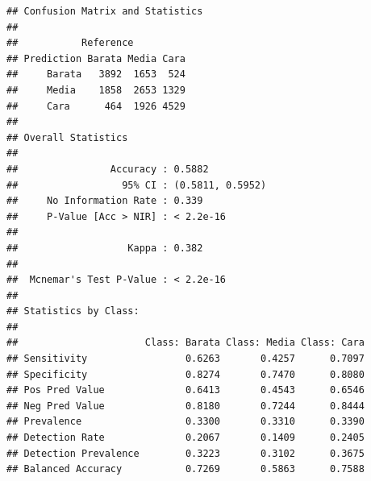 \documentclass[
]{article}
\newenvironment{Shaded}{\begin{snugshade}}{\end{snugshade}}
\newcommand{\AttributeTok}[1]{\textcolor[rgb]{0.13,0.29,0.53}{#1}}
\newcommand{\ConstantTok}[1]{\textcolor[rgb]{0.56,0.35,0.01}{#1}}
\newcommand{\DecValTok}[1]{\textcolor[rgb]{0.00,0.00,0.81}{#1}}
\newcommand{\FloatTok}[1]{\textcolor[rgb]{0.00,0.00,0.81}{#1}}
\newcommand{\FunctionTok}[1]{\textcolor[rgb]{0.13,0.29,0.53}{\textbf{#1}}}
\newcommand{\NormalTok}[1]{#1}
\newcommand{\OtherTok}[1]{\textcolor[rgb]{0.56,0.35,0.01}{#1}}
\newcommand{\SpecialCharTok}[1]{\textcolor[rgb]{0.81,0.36,0.00}{\textbf{#1}}}
\newcommand{\StringTok}[1]{\textcolor[rgb]{0.31,0.60,0.02}{#1}}
\begin{document}
\begin{Shaded}
\end{Shaded}

\begin{verbatim}
## Confusion Matrix and Statistics
## 
##           Reference
## Prediction Barata Media Cara
##     Barata   3892  1653  524
##     Media    1858  2653 1329
##     Cara      464  1926 4529
## 
## Overall Statistics
##                                           
##                Accuracy : 0.5882          
##                  95% CI : (0.5811, 0.5952)
##     No Information Rate : 0.339           
##     P-Value [Acc > NIR] : < 2.2e-16       
##                                           
##                   Kappa : 0.382           
##                                           
##  Mcnemar's Test P-Value : < 2.2e-16       
## 
## Statistics by Class:
## 
##                      Class: Barata Class: Media Class: Cara
## Sensitivity                 0.6263       0.4257      0.7097
## Specificity                 0.8274       0.7470      0.8080
## Pos Pred Value              0.6413       0.4543      0.6546
## Neg Pred Value              0.8180       0.7244      0.8444
## Prevalence                  0.3300       0.3310      0.3390
## Detection Rate              0.2067       0.1409      0.2405
## Detection Prevalence        0.3223       0.3102      0.3675
## Balanced Accuracy           0.7269       0.5863      0.7588
\end{verbatim}
\end{document}
